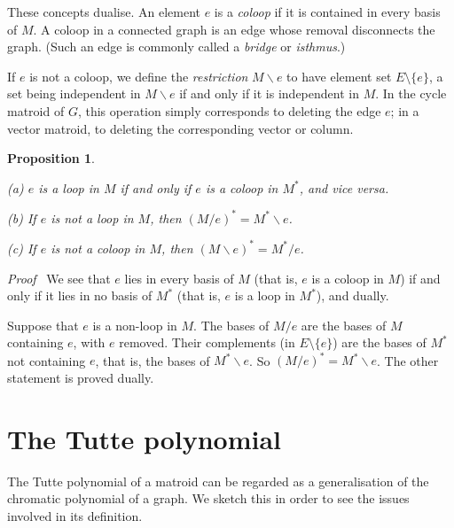 \documentclass[12pt]{article}
\newtheorem{proposition}[theorem]{Proposition}
\newcommand{\head}[1]{\medbreak\noindent\textit{#1}\ }
\begin{document}
\medbreak

These concepts dualise. An element $e$ is a \emph{coloop} if it
is contained in every basis of $M$. A coloop in a connected
graph is an edge whose removal disconnects the graph. (Such an
edge is commonly called a \emph{bridge} or \emph{isthmus}.)

If $e$ is not a coloop, we define the \emph{restriction}
$M\backslash e$ to have element set $E\setminus\{e\}$, a set
being independent in $M\backslash e$ if and only if it is
independent in $M$. In the cycle matroid of $G$, this
operation simply corresponds to deleting the edge $e$; in a
vector matroid, to deleting the corresponding vector or column.

\begin{proposition}
\begin{description}
\item{(a)} $e$ is a loop in $M$ if and only if $e$ is a coloop
in $M^*$, and \emph{vice versa}.
\item{(b)} If $e$ is not a loop in $M$, then $(M/e)^*=
M^*\backslash e$.
\item{(c)} If $e$ is not a coloop in $M$, then $(M\backslash e)^*=
M^*/e$.
\end{description}
\end{proposition}

\head{Proof}  We see that $e$ lies in every basis of $M$ (that is,
$e$ is a coloop in $M$) if and only if it lies in no basis of $M^*$
(that is, $e$ is a loop in $M^*$), and dually.

Suppose that $e$ is a non-loop in $M$. The bases of $M/e$ are the
bases of $M$ containing $e$, with $e$ removed. Their complements
(in $E\setminus\{e\}$) are the bases of $M^*$ not containing $e$,
that is, the bases of $M^*\backslash e$. So $(M/e)^*=M^*\backslash e$.
The other statement is proved dually.

\section{The Tutte polynomial}

The Tutte polynomial of a matroid can be regarded as a generalisation
of the chromatic polynomial of a graph. We sketch this in order to
see the issues involved in its definition.
\end{document}

